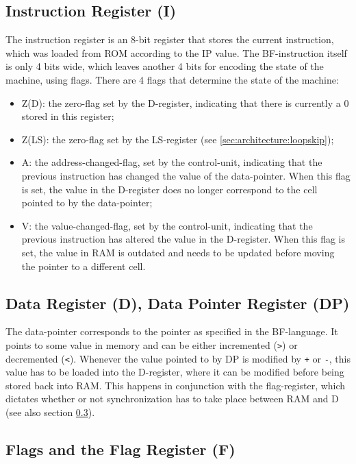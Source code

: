 \subsection{Instruction Register (I)}
The instruction register is an 8-bit register that stores the current instruction, which was loaded from ROM according to the IP value. The BF-instruction itself is only 4 bits wide, which leaves another 4 bits for encoding the state of the machine, using flags. There are 4 flags that determine the state of the machine:
\begin{itemize}
\item Z(D): the zero-flag set by the D-register, indicating that there is currently a 0 stored in this register;
\item Z(LS): the zero-flag set by the LS-register (see \ref{sec:architecture:loopskip});
\item A: the address-changed-flag, set by the control-unit, indicating that the previous instruction has changed the value of the data-pointer. When this flag is set, the value in the D-register does no longer correspond to the cell pointed to by the data-pointer;
\item V: the value-changed-flag, set by the control-unit, indicating that the previous instruction has altered the value in the D-register. When this flag is set, the value in RAM is outdated and needs to be updated before moving the pointer to a different cell.
\end{itemize}

\subsection{Data Register (D), Data Pointer Register (DP)}
The data-pointer corresponds to the pointer as specified in the BF-language. It points to some value in memory and can be either incremented (\texttt{>}) or decremented (\texttt{<}). Whenever the value pointed to by DP is modified by \texttt{+} or \texttt{-}, this value has to be loaded into the D-register, where it can be modified before being stored back into RAM. This happens in conjunction with the flag-register, which dictates whether or not synchronization has to take place between RAM and D (see also section \ref{sec:architecture:flags}).

\subsection{Flags and the Flag Register (F)} \label{sec:architecture:flags}
